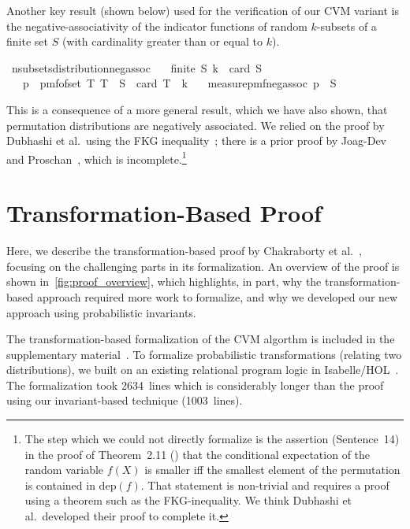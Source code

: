 \documentclass[a4paper,UKenglish,cleveref, autoref, thm-restate]{lipics-v2021}
\newenvironment{isabelle_cm}{\begin{mdframed}[backgroundcolor=shadecolor,nobreak=true,linewidth=0]\begin{isabelle}}{\end{isabelle}\end{mdframed}}%
\newcommand\locnew{1003}
\newcommand\locold{2634}
\begin{document}
Another key result (shown below) used for the verification of our CVM variant is the negative-associativity of the indicator functions of random $k$-subsets of a finite set $S$ (with cardinality greater than or equal to $k$).
\begin{isabelle_cm}
\isamarkupfalse%
\ n{\isacharunderscore}{\kern0pt}subsets{\isacharunderscore}{\kern0pt}distribution{\isacharunderscore}{\kern0pt}neg{\isacharunderscore}{\kern0pt}assoc{\isacharcolon}{\kern0pt}\isanewline
\ \ \ {\isacartoucheopen}finite\ S{\isacartoucheclose}\ {\isacartoucheopen}k\ {\isasymle}\ card\ S{\isacartoucheclose}\isanewline
\ \ \ {\isacartoucheopen}p\ {\isasymequiv}\ pmf{\isacharunderscore}{\kern0pt}of{\isacharunderscore}{\kern0pt}set\ {\isacharbraceleft}{\kern0pt}T{\isachardot}{\kern0pt}\ T\ {\isasymsubseteq}\ S\ {\isasymand}\ card\ T\ {\isacharequal}{\kern0pt}\ k{\isacharbraceright}{\kern0pt}{\isacartoucheclose}\isanewline
\ \ \ {\isacartoucheopen}measure{\isacharunderscore}{\kern0pt}pmf{\isachardot}{\kern0pt}neg{\isacharunderscore}{\kern0pt}assoc\ p\ {\isacharparenleft}{\kern0pt}{\isasymin}{\isacharparenright}{\kern0pt}\ S{\isacartoucheclose}
\end{isabelle_cm}
This is a consequence of a more general result, which we have also shown, that permutation distributions are negatively associated.
We relied on the proof by Dubhashi et al.\ using the FKG inequality~\cite[Th. 10]{dubhashi1996}; there is a prior proof by Joag-Dev and Proschan~\cite[Th. 2.11]{joagdev1983}, which is incomplete.\footnote{The step which we could not directly formalize is the assertion (Sentence~14) in the proof of Theorem~2.11 (\cite{joagdev1983}) that the conditional expectation of the random variable $f(X)$ is smaller iff the smallest element of the permutation is contained in $\mathrm{dep}(f)$. That statement is non-trivial and requires a proof using a theorem such as the FKG-inequality. We think Dubhashi et al.\ developed their proof to complete it.}

\section{Transformation-Based Proof}\label{sec:transformation_based_proof}
Here, we describe the transformation-based proof by Chakraborty et al.~\cite{chakraborty2023}, focusing on the challenging parts in its formalization.
An overview of the proof is shown in~\cref{fig:proof_overview}, which highlights, in part, why the transformation-based approach required more work to formalize, and why we developed our new approach using probabilistic invariants.
\begin{note}
The transformation-based formalization of the CVM algorthm is included in the supplementary material~\cite{CVM_Transforms-Github}.
To formalize probabilistic transformations (relating two distributions), we built on an existing relational program logic in Isabelle/HOL~\cite{lochbihler2016}.
The formalization took \locold~lines which is considerably longer than the proof using our invariant-based technique (\locnew~lines).
\lipicsEnd\end{note}
\end{document}
